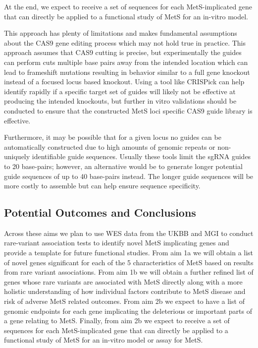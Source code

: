 \documentclass[11pt]{article}
\begin{document}
At the end, we expect to receive a set of sequences for each MetS-implicated gene that can directly be applied to a functional study of MetS for an in-vitro model.

\noindent {}

This approach has plenty of limitations and makes fundamental assumptions about the CAS9 gene editing process which may not hold true in practice. This approach assumes that CAS9 cutting is precise, but experimentally the guides can perform cuts multiple base pairs away from the intended location which can lead to frameshift mutations resulting in behavior similar to a full gene knockout instead of a focused locus based knockout. Using a tool like CRISPick can help identify rapidly if a specific target set of guides will likely not be effective at producing the intended knockouts, but further in vitro validations should be conducted to ensure that the constructed MetS loci specific CAS9 guide library is effective.

Furthermore, it may be possible that for a given locus no guides can be automatically constructed due to high amounts of genomic repeats or non-uniquely identifiable guide sequences. Usually these tools limit the sgRNA guides to 20 base-pairs; however, an alternative would be to generate longer potential guide sequences of up to 40 base-pairs instead. The longer guide sequences will be more costly to assemble but can help ensure sequence specificity.

\subsection*{Potential Outcomes and Conclusions}

Across these aims we plan to use WES data from the UKBB and MGI to conduct rare-variant association tests to identify novel MetS implicating genes and provide a template for future functional studies. From aim 1a we will obtain a list of novel genes significant for each of the 5 characteristics of MetS based on results from rare variant associations. From aim 1b we will obtain a further refined list of genes whose rare variants are associated with MetS directly along with a more holistic understanding of how individual factors contribute to MetS disease and risk of adverse MetS related outcomes. From aim 2b we expect to have a list of genomic endpoints for each gene implicating the deleterious or important parts of a gene relating to MetS. Finally, from aim 2b we expect to receive a set of sequences for each MetS-implicated gene that can directly be applied to a functional study of MetS for an in-vitro model or assay for MetS.
\end{document}
